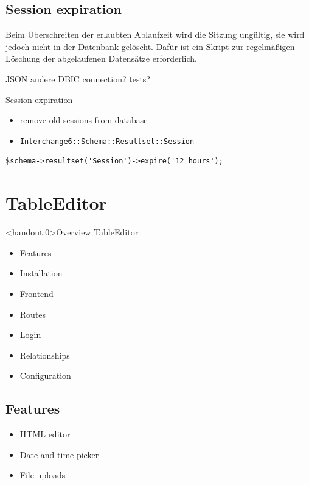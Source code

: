 \subsection{Session expiration}

Beim Überschreiten der erlaubten Ablaufzeit wird die Sitzung
ungültig, sie wird jedoch nicht in der Datenbank gelöscht.
Dafür ist ein Skript zur regelmäßigen Löschung der
abgelaufenen Datensätze erforderlich.

JSON
andere DBIC connection?
tests?

\begin{frame}[fragile]{Session expiration}
\begin{itemize}
\item remove old sessions from database
\item \verb|Interchange6::Schema::Resultset::Session|
\end{itemize}
\begin{lstlisting}
$schema->resultset('Session')->expire('12 hours');
\end{lstlisting}
\end{frame}

\section{TableEditor}

\begin{frame}<handout:0>{Overview TableEditor}
\begin{itemize}
\item Features
\item Installation
\item Frontend
\item Routes
\item Login
\item Relationships
\item Configuration
\end{itemize}
\end{frame}

\subsection{Features}
\begin{frame}
\begin{itemize}
\item HTML editor
\item Date and time picker
\item File uploads
\end{itemize}
\end{frame}

